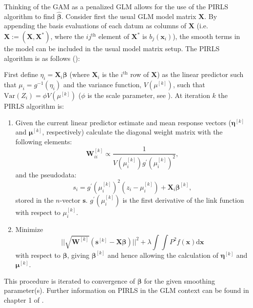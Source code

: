 Thinking of the GAM as a penalized GLM allows for the use of the PIRLS algorithm to find $\bm{\hat{\beta}}$. Consider first the usual GLM model matrix $\mathbf{X}$. By appending the basis evaluations of each datum as columns of $\mathbf{X}$ (i.e. $\mathbf{X}:=\left ( \mathbf{X},\mathbf{X}^* \right )$, where the $ij^\text{th}$ element of $\mathbf{X}^*$ is  $b_j(\mathbf{x}_i)$), the smooth terms in the model can be included in the usual model matrix setup. The PIRLS algorithm is as follows (\cite[p. 138]{simonbook}):

First define $\eta_i = \mathbf{X}_i\bm{\beta}$ (where $\mathbf{X}_i$ is the $i^\text{th}$ row of $\mathbf{X}$) as the linear predictor such that $\mu_i = g^{-1}(\eta_i)$ and the variance function, $V(\mu^{[k]})$, such that $\text{Var}\left ( Z_i \right ) = \phi V(\mu^{[k]})$ ($\phi$ is the scale parameter, see \cite[p. 62]{simonbook}). At iteration $k$ the PIRLS algorithm is:
\begin{enumerate}
\item Given the current linear predictor estimate and mean response vectors ($\bm{\eta}^{[k]}$ and $\bm{\mu}^{[k]}$, respectively) calculate the diagonal weight matrix with the following elements:
\begin{equation*}
\mathbf{W}^{[k]}_{ii}  \propto \frac{1}{V(\mu_i^{[k]})g^\prime(\mu_i^{[k]})^2},
\end{equation*}
and the pseudodata:
\begin{equation*}
s_i = g^\prime(\mu_i^{[k]})^2(z_i-\mu_i^{[k]}) + \mathbf{X}_i\bm{\beta}^{[k]},
\end{equation*}
stored in the $n$-vector $\mathbf{s}$. $g^\prime(\mu_i^{[k]})$ is the first derivative of the link function with respect to $\mu_i^{[k]}$.
\item Minimize
\begin{equation*}
\lvert \lvert \sqrt{\mathbf{W}^{[k]}} (\mathbf{s}^{[k]} - \mathbf{X}\bm{\beta})  \rvert \rvert^2 + \lambda \int\int P^2 f(\mathbf{x}) \text{d}\mathbf{x}
\end{equation*}
with respect to $\bm{\beta}$, giving $\bm{\beta}^{[k]}$ and hence allowing the calculation of $\bm{\eta}^{[k]}$ and $\bm{\mu}^{[k]}$.
\end{enumerate}
This procedure is iterated to convergence of $\bm{\beta}$ for the given smoothing parameter(s). Further information on PIRLS in the GLM context can be found in chapter 1 of .

